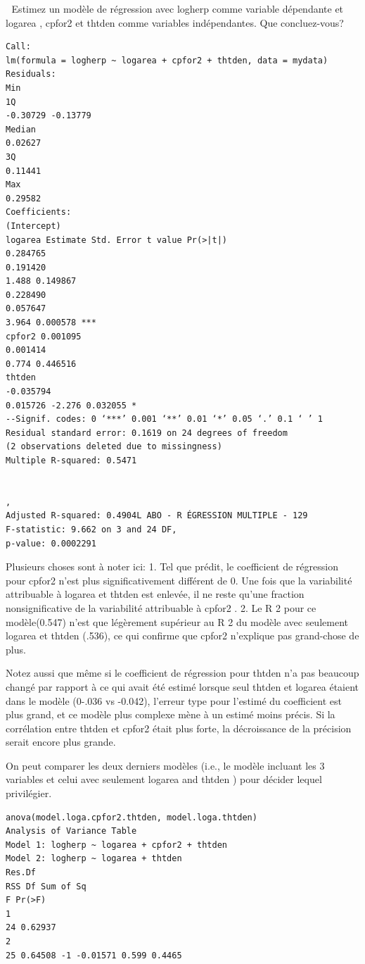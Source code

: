 \documentclass[12pt,]{book}
\begin{document}
 Estimez un modèle de régression avec logherp comme variable dépendante et logarea , cpfor2 et thtden comme variables indépendantes. Que concluez-vous?

\begin{verbatim}
Call:
lm(formula = logherp ~ logarea + cpfor2 + thtden, data = mydata)
Residuals:
Min
1Q
-0.30729 -0.13779
Median
0.02627
3Q
0.11441
Max
0.29582
Coefficients:
(Intercept)
logarea Estimate Std. Error t value Pr(>|t|)
0.284765
0.191420
1.488 0.149867
0.228490
0.057647
3.964 0.000578 ***
cpfor2 0.001095
0.001414
0.774 0.446516
thtden
-0.035794
0.015726 -2.276 0.032055 *
--Signif. codes: 0 ‘***’ 0.001 ‘**’ 0.01 ‘*’ 0.05 ‘.’ 0.1 ‘ ’ 1
Residual standard error: 0.1619 on 24 degrees of freedom
(2 observations deleted due to missingness)
Multiple R-squared: 0.5471


,
Adjusted R-squared: 0.4904L ABO - R ÉGRESSION MULTIPLE - 129
F-statistic: 9.662 on 3 and 24 DF,
p-value: 0.0002291
\end{verbatim}

Plusieurs choses sont à noter ici:
1. Tel que prédit, le coefficient de régression pour cpfor2 n'est plus significativement différent de 0. Une fois que la variabilité attribuable à logarea et thtden est enlevée, il ne reste qu'une fraction nonsignificative de la variabilité attribuable à cpfor2 .
2. Le R 2 pour ce modèle(0.547) n'est que légèrement supérieur au R 2 du modèle avec seulement logarea et thtden (.536), ce qui confirme que cpfor2 n'explique pas grand-chose de plus.

Notez aussi que même si le coefficient de régression pour thtden n'a pas beaucoup changé par rapport à ce qui avait été estimé lorsque seul thtden et logarea étaient dans le modèle (0-.036 vs -0.042), l'erreur type pour l'estimé du coefficient est plus grand, et ce modèle plus complexe mène à un estimé moins précis. Si la corrélation entre thtden et cpfor2 était plus forte, la décroissance de la précision serait encore plus grande.

On peut comparer les deux derniers modèles (i.e., le modèle incluant les 3 variables et celui avec seulement logarea and thtden ) pour décider lequel privilégier.

\begin{verbatim}
anova(model.loga.cpfor2.thtden, model.loga.thtden)
Analysis of Variance Table
Model 1: logherp ~ logarea + cpfor2 + thtden
Model 2: logherp ~ logarea + thtden
Res.Df
RSS Df Sum of Sq
F Pr(>F)
1
24 0.62937
2
25 0.64508 -1 -0.01571 0.599 0.4465
\end{verbatim}
\end{document}
